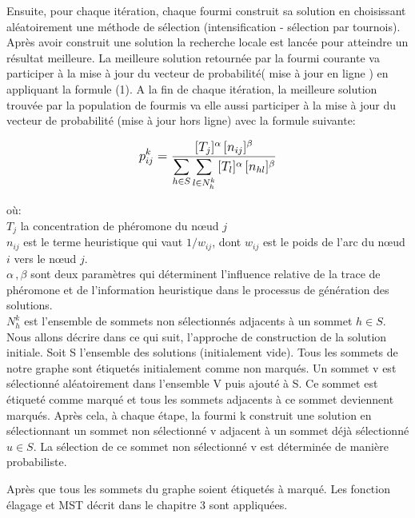\begin{enumerate}
Ensuite, pour chaque itération, chaque fourmi construit sa solution en choisissant aléatoirement une méthode de sélection (intensification - sélection par tournois). Après avoir construit une solution la recherche locale est lancée pour atteindre un résultat meilleure. La meilleure solution retournée par la fourmi courante va participer à la mise à jour du vecteur de probabilité( mise à jour en ligne ) en appliquant la formule (1). A la fin de chaque itération, la meilleure solution trouvée par la population de fourmis va elle aussi participer à la mise à jour du vecteur de probabilité  (mise à jour hors ligne) avec la formule suivante:

\begin{equation}
	\mathlarger{
		p_{ij}^k = \frac{
				[T_j]^\alpha \, [n_{ij}]^\beta
			}{
				\mathlarger{\sum}_{h \in S} \, \mathlarger{\sum}_{l \in N_h^k} \, [T_l]^\alpha \, [n_{hl}]^\beta
			}
	}
\end{equation}


où:\\
$T_j$ la concentration de phéromone du nœud $j$ \\
$n_{ij}$ est le terme heuristique qui vaut $1 / w_{ij}$, dont $w_{ij}$ est le poids de l’arc du nœud $i$ vers le nœud $j$.\\
$\alpha \, , \beta$ sont deux paramètres qui déterminent l'influence relative de la trace de phéromone et de l'information heuristique dans le processus de génération des solutions. \\
$N_h^k$ est l'ensemble de sommets non sélectionnés adjacents à un sommet $h \in S$. \\

Nous allons décrire dans ce qui suit, l'approche de construction de la solution initiale. Soit S l'ensemble des solutions (initialement vide). Tous les sommets de notre graphe sont étiquetés initialement comme non marqués. Un sommet v est sélectionné aléatoirement dans l'ensemble V puis  ajouté à S. Ce sommet est étiqueté comme marqué et tous les sommets adjacents à ce sommet deviennent marqués. Après cela, à chaque étape, la fourmi k construit une solution en sélectionnant un sommet non sélectionné v adjacent à un sommet déjà sélectionné $u \in S$. La sélection de ce sommet non sélectionné v est déterminée de manière probabiliste.


Après que tous les sommets du graphe soient étiquetés à marqué. Les fonction élagage et MST décrit dans le chapitre 3 sont appliquées.\\


\end{enumerate}
